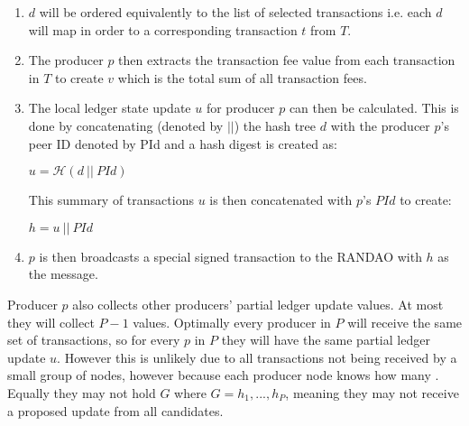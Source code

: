\begin{enumerate}


\item $d$ will be ordered equivalently to the list of selected transactions i.e. each $d$ will map in order to a corresponding transaction $t$ from $T$. 

\item The producer $p$ then extracts the transaction fee value from each transaction in $T$ to create $v$ which is the total sum of all transaction fees.

\item The local ledger state update $u$ for producer $p$ can then be calculated. This is done by concatenating (denoted by $||$) the hash tree $d$ with the producer $p$'s peer ID denoted by PId and a hash digest is created as:

\begin{center}
$u = \mathcal{H}(d~||~PId)$
\end{center}

This summary of transactions $u$ is then concatenated with $p$'s $PId$ to create:

\begin{center}
$h = u ~||~PId$
\end{center}

\item $p$ is then broadcasts a special signed transaction to the RANDAO with $h$ as the message.
\end{enumerate}


Producer $p$ also collects other producers' partial ledger update values. At most they will collect $P-1$ values. Optimally every producer in $P$ will receive the same set of transactions, so for every $p$ in $P$ they will have the same partial ledger update $u$. However this is unlikely due to all transactions not being received by a small group of nodes, however because each producer node knows how many . Equally they may not hold $G$ where $G = h_1,...,h_P$, meaning they may not receive a proposed update from all candidates.
